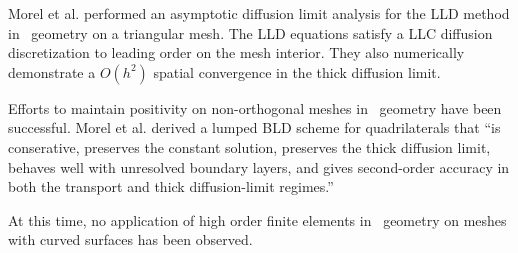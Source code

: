 \documentclass{article}
\begin{document}
Morel et al. \cite{MorelLLDrz} performed an asymptotic diffusion limit analysis for the LLD method in \RZ\ geometry on a triangular mesh. The LLD equations satisfy a LLC diffusion discretization to leading order on the mesh interior. They also numerically demonstrate a $O(h^2)$ spatial convergence in the thick diffusion limit.

Efforts to maintain positivity on non-orthogonal meshes in \RZ\ geometry have been successful. Morel et al. \cite{MorelLBLD} derived a lumped BLD scheme for quadrilaterals that ``is conserative, preserves the constant solution, preserves the thick diffusion limit, behaves well with unresolved boundary layers, and gives second-order accuracy in both the transport and thick diffusion-limit regimes.''

At this time, no application of high order finite elements in \RZ\ geometry on meshes with curved surfaces has been observed.

%
%
\end{document}
